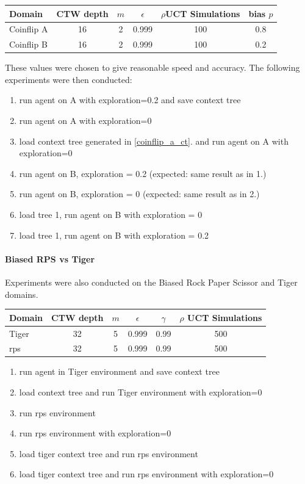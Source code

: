 \documentclass[paper=a4, fontsize=11pt]{scrartcl} %
\numberwithin{equation}{section} %
\numberwithin{figure}{section} %
\numberwithin{table}{section} %
\begin{document}
\begin{tabular}{|l|c|c|c|c|c|}
\hline
Domain & CTW depth & $m$ & $\epsilon$ & $\rho$UCT Simulations & bias $p$\\\hline
Coinflip A & 16 & 2 & 0.999 & 100 & 0.8\\
Coinflip B & 16 & 2 & 0.999 & 100 & 0.2\\\hline
\end{tabular}

\bigskip

These values were chosen to give reasonable speed and accuracy. The following experiments were then conducted:

\begin{enumerate}
 \setlength{\itemsep}{0cm}%
  \setlength{\parskip}{0cm}%
\item run agent on A with exploration=0.2 and save context tree\label{coinflip_a_ct}
\item run agent on A with exploration=0
\item load context tree generated in \ref{coinflip_a_ct}. and run agent on A with exploration=0
\item run agent on B, exploration = 0.2 (expected: same result as in 1.)
\item run agent on B, exploration = 0 (expected: same result as in 2.)
\item load tree 1, run agent on B with exploration = 0
\item load tree 1, run agent on B with exploration = 0.2
\end{enumerate}

\paragraph{Biased RPS vs Tiger}
Experiments were also conducted on the Biased Rock Paper Scissor and Tiger domains.

\bigskip

\begin{tabular}{|l|c|c|c|c|c|}
\hline
Domain & CTW depth & $m$ & $\epsilon$ &$\gamma $ & $\rho$ UCT Simulations\\\hline
Tiger & 32 & 5 & 0.999 & 0.99 & 500\\
rps & 32 & 5 & 0.999 & 0.99 & 500\\\hline
\end{tabular}

\bigskip

\begin{enumerate}
 \setlength{\itemsep}{0cm}%
  \setlength{\parskip}{0cm}%
\item run agent in Tiger environment and save context tree
\item load context tree and run Tiger environment with exploration=0
\item run rps environment
\item run rps environment with exploration=0
\item load tiger context tree and run rps environment 
\item load tiger context tree and run rps environment with exploration=0
\end{enumerate}
\end{document}
